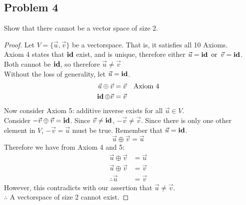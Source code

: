 \subsection*{Problem 4}
Show that there cannot be a vector space of size 2.
\begin{proof}
  Let $V = \{\vec{u}, \vec{v}\}$ be a vectorspace. That is, it satisfies all 10 Axioms. \\
  Axiom 4 states that $\operatorname{\textbf{id}}$ exist, and is unique, therefore either $\vec{u} = \operatorname{\textbf{id}} \operatorname{~\text{or}~} \vec{v} = \operatorname{\textbf{id}}$. Both cannot be $\operatorname{\textbf{id}}$, so therefore $\vec{u} \neq \vec{v}$ \\
  Without the loss of generality, let $\vec{u} = \operatorname{\textbf{id}}$.
  \begin{align*}
    \vec{u} \oplus \vec{v} & = \vec{v} & \text{Axiom 4} \\
    \operatorname{\textbf{id}} \oplus \vec{v}     & = \vec{v}
  \end{align*}
  Now consider Axiom 5: additive inverse exists for all $\vec{u} \in V$. \\
  Consider $-\vec{v} \oplus \vec{v} = \operatorname{\textbf{id}}$. Since $\vec{v} \neq \operatorname{\textbf{id}}$, $-\vec{v} \neq \vec{v}$. Since there is only one other element in $V$, $-\vec{v} = \vec{u}$ must be true. Remember that $\vec{u} = \operatorname{\textbf{id}}$.
  \[
    \vec{u} \oplus \vec{v} = \vec{u}
  \]
  Therefore we have from Axiom 4 and 5:
  \begin{align*}
    \vec{u} \oplus \vec{v} & = \vec{u} \\
    \vec{u} \oplus \vec{v} & = \vec{v} \\
    \therefore \vec{u}     & = \vec{v}
  \end{align*}
  However, this contradicts with our assertion that $\vec{u} \neq \vec{v}$. \\
  $\therefore$ A vectorspace of size 2 cannot exist.

\end{proof}
